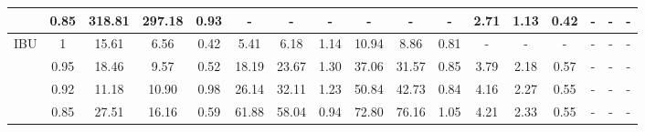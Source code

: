 \begin{table}
\begin{tabular}{lcccccccccccccccc}
		& 0.85 & 318.81 & 297.18 & 0.93 & - & - & - & - & - & - & 2.71 & 1.13 & 0.42 & - & - & - \\ \midrule
		IBU & 1 & 15.61 & 6.56 & 0.42 & 5.41 & 6.18 & 1.14 & 10.94 & 8.86 & 0.81 & - & - & - & - & - & - \\ 
		& 0.95 & 18.46 & 9.57 & 0.52 & 18.19 & 23.67 & 1.30 & 37.06 & 31.57 & 0.85 & 3.79 & 2.18 & 0.57 & - & - & - \\ 
		& 0.92 & 11.18 & 10.90 & 0.98 & 26.14 & 32.11 & 1.23 & 50.84 & 42.73 & 0.84 & 4.16 & 2.27 & 0.55 & - & - & - \\ 
		& 0.85 & 27.51 & 16.16 & 0.59 & 61.88 & 58.04 & 0.94 & 72.80 & 76.16 & 1.05 & 4.21 & 2.33 & 0.55 & - & - & - \\ \bottomrule
	\end{tabular}
	\label{tab:piky}
\end{table}



